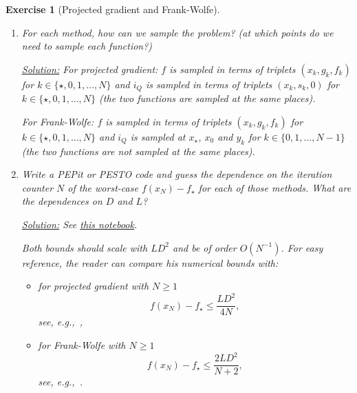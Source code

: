 \documentclass[11pt,a4paper]{article}
\newcommand{\pesto}{{PESTO }}
\newcommand{\pepit}{{PEPit }}
\newcommand{\correction}[1]{{{\color{blue}\underline{Solution:} #1}}}
\newcommand{\correction}[1]{}
\newtheorem{exercise}{Exercise}
\begin{document}
\begin{exercise}[Projected gradient and Frank-Wolfe]
\begin{enumerate}
{	}
	
	\item For each method, how can we sample the problem? (at which points do we need to sample each function?)
	
	\correction{For projected gradient: $f$ is sampled in terms of triplets $(x_k,g_k,f_k)$ for $k\in\{\star,0,1,\ldots,N\}$ and $i_Q$ is sampled in terms of triplets $(x_k,s_k,0)$ for $k\in\{\star,0,1,\ldots,N\}$ (the two functions are sampled at the same places).
	
	For Frank-Wolfe: $f$ is sampled in terms of triplets $(x_k,g_k,f_k)$ for $k\in\{\star,0,1,\ldots,N\}$ and $i_Q$ is sampled at $x_\star$, $x_0$ and $y_k$ for $k\in\{0,1,\ldots,N-1\}$ (the two functions are not sampled at the same places).
	}
	
	\item Write a \pepit or \pesto code and guess the dependence on the iteration counter $N$ of the worst-case $f(x_N)-f_\star$ for each of those methods. What are the dependences on $D$ and $L$?
	
	\correction{See \href{https://github.com/PerformanceEstimation/Learning-Performance-Estimation/tree/main/Codes/Jupyter/Exercise05.ipynb}{this notebook}.
	
	Both bounds should scale with $LD^2$ and be of order $O(N^{-1})$. For easy reference, the reader can compare his numerical bounds with:
	\begin{itemize}
	\item for projected gradient with $N\geqslant 1$
	\[ f(x_N)-f_\star\leqslant \frac{LD^2}{4N},\]
	see, e.g.,~\cite[Theorem 2.9]{drori2014contributions},
	\item for Frank-Wolfe with $N\geqslant 1$
	\[ f(x_N)-f_\star\leqslant \frac{2LD^2}{N+2}, \]
	see, e.g.,~\cite[Theorem 1]{jaggi2013revisiting}.
	\end{itemize}
	
	
	}
	\end{enumerate}
	\end{exercise}	
	
\end{document}
